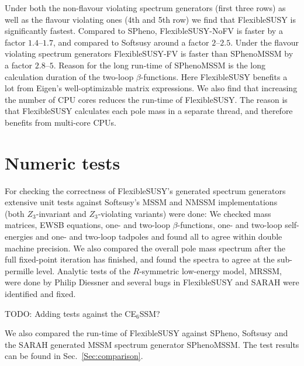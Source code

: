 \documentclass[final,3p,11pt,pdflatex]{elsarticle}
\makeatletter
\newcommand{\fs}{FlexibleSUSY\@\xspace}
\newcommand{\secref}[1]{Sec.~\ref{#1}}
\makeatother
\begin{document}
Under both the non-flavour violating spectrum generators (first three
rows) as well as the flavour violating ones (4th and 5th row) we find
that \fs is significantly fastest.  Compared to SPheno,
FlexibleSUSY-NoFV is faster by a factor $1.4$--$1.7$, and compared to
Softsusy around a factor $2$--$2.5$.  Under the flavour violating
spectrum generators FlexibleSUSY-FV is faster than SPhenoMSSM by a
factor $2.8$--$5$.  Reason for the long run-time of SPhenoMSSM is the
long calculation duration of the two-loop $\beta$-functions.  Here \fs
benefits a lot from Eigen's well-optimizable matrix expressions.  We
also find that increasing the number of CPU cores reduces the run-time
of \fs.  The reason is that \fs calculates each pole mass in a
separate thread, and therefore benefits from multi-core CPUs.

\appendix
\section{Numeric tests}

For checking the correctness of \fs's generated spectrum generators
extensive unit tests against Softsusy's MSSM and NMSSM
implementations (both $Z_3$-invariant and $Z_3$-violating variants)
were done: We checked mass matrices, EWSB equations, one- and two-loop
$\beta$-functions, one- and two-loop self-energies and one- and
two-loop tadpoles and found all to agree within double machine
precision.  We also compared the overall pole mass spectrum after the
full fixed-point iteration has finished, and found the spectra to
agree at the sub-permille level.  Analytic tests of the $R$-symmetric
low-energy model, MRSSM, were done by Philip Diessner and several bugs
in \fs and SARAH were identified and fixed.

TODO: Adding tests against the CE$_6$SSM?

We also compared the run-time of \fs against SPheno, Softsusy and the
SARAH generated MSSM spectrum generator SPhenoMSSM.  The test results
can be found in \secref{Sec:comparison}.
\end{document}
